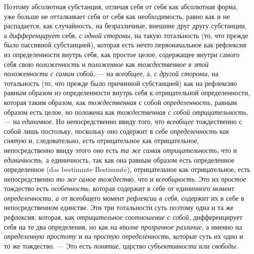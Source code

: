 Поэтому абсолютная субстанция, отличая себя от себя как абсолютная форма,
уже больше не отталкивает себя от себя как необходимость, равно как и не
распадается, как случайность, на безразличные, внешние друг другу
субстанции, а {\em дифференцирует} себя,
{\em с одной стороны}, на такую тотальность (то, что
прежде было пассивной субстанцией), которая есть нечто первоначальное как
рефлексия из определенности внутрь себя, как простое целое, содержащее
внутри самого себя свою {\em положенность} и
{\em положенное} как
{\em тождественное в этой положенности с самим собой},
— на {\em всеобщее}, а, {\em с
другой стороны}, на тотальность (то, что прежде было причинной субстанцией)
как на рефлексию равным образом из определенности внутрь себя к
отрицательной определенности, которая таким образом, как
{\em тождественная} с собой
{\em определенность}, равным образом есть целое, но
положена как {\em тождественная с собой
отрицательность},— на {\em единичное}. Но
непосредственно ввиду того, что {\em всеобщее}
тождественно с собой лишь постольку, поскольку оно содержит в себе
{\em определенность} {\em как
снятую} и, следовательно, есть отрицательное как отрицательное,
непосредственно ввиду этого оно есть {\em та же самая
отрицательность}, что и {\em единичность}, а
единичность, так как она равным образом есть определенное определенное (das
bestimmte Bestimmte),
отрицательное как отрицательное, есть непосредственно
{\em то же самое тождество}, что и
{\em всеобщность}. Это их
{\em простое} тождество есть
{\em особенность}, которая содержит в себе от
единичного момент {\em определенности},
{\em а} от всеобщего момент
{\em рефлексии в себя}, содержит их в себе в
непосредственном единстве. Эти три тотальности суть поэтому одна и та же
рефлексия, которая, как {\em отрицательное соотношение
с собой}, дифференцирует себя на те два определения, но как на
{\em вполне прозрачное различие}, а именно на
{\em определенную простоту} и на
{\em простую определенность}, которые суть их одно и то
же тождество. — Это есть {\em понятие}, царство
{\em субъективности} или
{\em свободы}.


\bigskip

